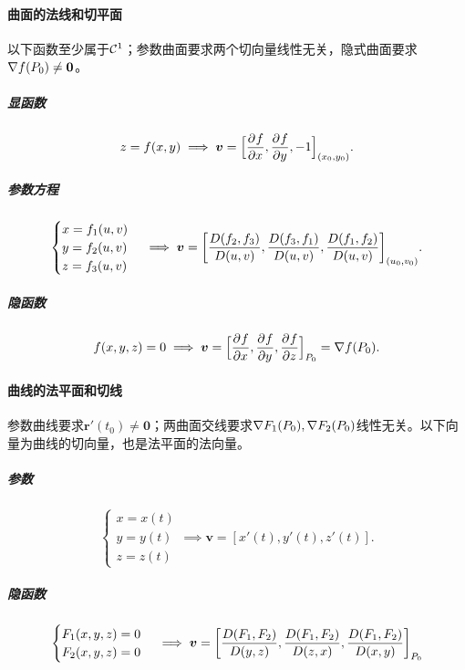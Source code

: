 \paragraph{曲面的法线和切平面}
以下函数至少属于$\mathcal{C}^1$；参数曲面要求两个切向量线性无关，隐式曲面要求$\nabla f(P_0) \neq \bm0$。
\subparagraph{显函数}
\begin{equation}\label{eq:calc-graph-normal}
	z = f(x,y) \implies \bm v = \Bigl[\frac{\partial^{}f}{\partial{x}^{}},\frac{\partial^{}f}{\partial{y}^{}},-1\Bigr]_{(x_0,y_0)}.
\end{equation}
\subparagraph{参数方程}
\begin{equation}\label{eq:calc-parametrized-surface-normal}
	\begin{cases}
		x = f_1(u,v) \\
		y = f_2(u,v) \\
		z = f_3(u,v)
	\end{cases}
	\implies \bm v = \biggl[\frac{D(f_2,f_3)}{D(u,v)},\frac{D(f_3,f_1)}{D(u,v)},\frac{D(f_1,f_2)}{D(u,v)}\biggr]_{(u_0,v_0)}.
\end{equation}
\subparagraph{隐函数}
\begin{equation}\label{eq:calc-level-surface-normal}
	f(x,y,z) = 0 \implies \bm v = \Bigl[\frac{\partial^{}f}{\partial{x}^{}},\frac{\partial^{}f}{\partial{y}^{}},\frac{\partial^{}f}{\partial{z}^{}}\Bigr]_{P_0} = \nabla f(P_0).
\end{equation}
\paragraph{曲线的法平面和切线}
参数曲线要求$\bm r'(t_0) \neq \bm0$；两曲面交线要求$\nabla F_1(P_0),\nabla F_2(P_0)$线性无关。以下向量为曲线的切向量，也是法平面的法向量。
\subparagraph{参数}
\begin{equation}\label{eq:calc-space-curve-tangent}
	\begin{cases}
		x = x(t) \\[-1ex]
		y = y(t) \\[-1ex]
		z = z(t)
	\end{cases}
	\implies \bm v = [x'(t),y'(t),z'(t)].
\end{equation}
\subparagraph{隐函数}
\begin{equation}\label{eq:calc-intersection-tangent}
	\begin{cases}
		F_1(x,y,z) = 0 \\
		F_2(x,y,z) = 0
	\end{cases}
	\implies \bm v = \biggl[\frac{D(F_1,F_2)}{D(y,z)},\frac{D(F_1,F_2)}{D(z,x)},\frac{D(F_1,F_2)}{D(x,y)}\biggr]_{P_0}
\end{equation}
